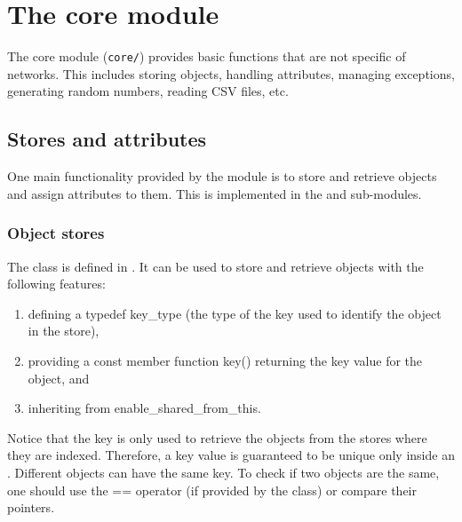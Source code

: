 \chapter{The core module} \label{ch:core}

The core module (\texttt{core/}) provides basic functions that are not specific of networks. This includes storing objects, handling attributes, managing exceptions, generating random numbers, reading CSV files, etc.

\section{Stores and attributes}

One main functionality provided by the  module is to store and retrieve objects and assign attributes to them. This is implemented in the  and  sub-modules.

\subsection{Object stores}

The class  is defined in . It can be used to store and retrieve objects with the following features:
\begin{enumerate}
\item defining a typedef key\_type (the type of the key used to identify the object in the store),
\item providing a const member function key() returning the key value for the object, and
\item inheriting from enable\_shared\_from\_this.
\end{enumerate}
Notice that the key is only used to retrieve the objects from the stores where they are indexed. Therefore, a key value is guaranteed to be unique only inside an . Different objects can have the same key. To check if two objects are the same, one should use the == operator (if provided by the class) or compare their pointers.

